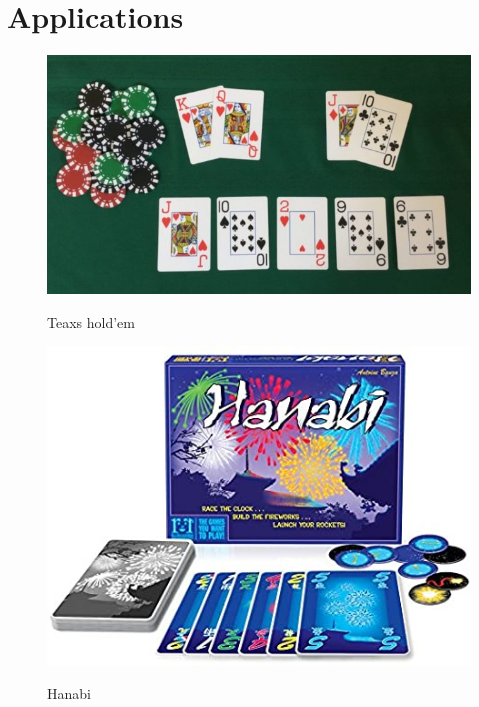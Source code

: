 \documentclass[notheorems, aspectratio=54]{beamer}
\begin{document}
\section{Applications}
\begin{frame}
  \vfill
  \begin{figure}[h]
  \begin{minipage}{0.45\textwidth}
    \includegraphics[width=\textwidth]{holdem-showdown-1280x720-600x338.jpg}
    \begin{center}
    Teaxs hold'em
    \end{center}
  \end{minipage}%
  \hspace{0.02\linewidth}
  \begin{minipage}{0.45\textwidth}
    \includegraphics[width=\textwidth]{hanabi.jpg}
    \begin{center}
    Hanabi
    \end{center}

\end{minipage}
\end{figure}
\end{frame}
\end{document}
